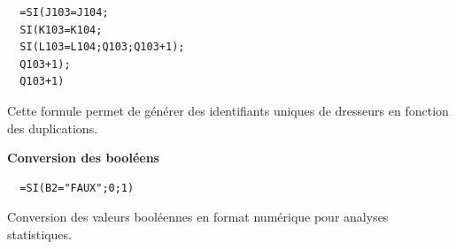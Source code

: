 \documentclass[mstat,12pt]{unswthesis}
\begin{document}
\begin{verbatim}
  =SI(J103=J104;
  SI(K103=K104;
  SI(L103=L104;Q103;Q103+1);
  Q103+1);
  Q103+1)
\end{verbatim}

\smallskip

Cette formule permet de générer des identifiants uniques de dresseurs en
fonction des duplications.

\bigskip
\bigskip

\textbf{Conversion des booléens}

\begin{verbatim}
  =SI(B2="FAUX";0;1)
\end{verbatim}

\smallskip

Conversion des valeurs booléennes en format numérique pour analyses
statistiques.
\end{document}
